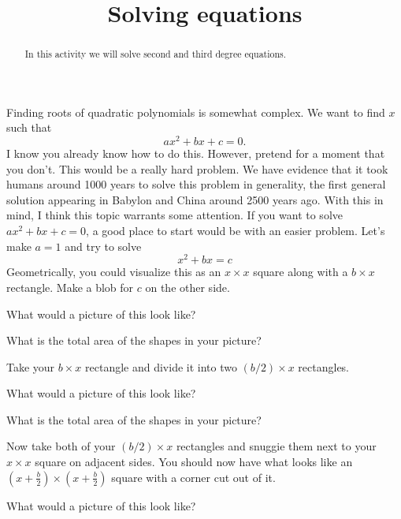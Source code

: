 \documentclass{ximera}
\title{Solving equations}
\begin{document}
\begin{abstract}
In this activity we will solve second and third degree equations.
\end{abstract}
\maketitle


Finding roots of quadratic polynomials is somewhat complex. We want to
find $x$ such that
\[
ax^2 + bx + c = 0.
\]
I know you already know how to do this. However, pretend for a moment
that you don't. This would be a really hard problem. We have evidence
that it took humans around 1000 years to solve this problem in
generality, the first general solution appearing in Babylon and China
around 2500 years ago. With this in mind, I think this topic warrants
some attention. If you want to solve $ax^2 + bx + c = 0$, a good place
to start would be with an easier problem. Let's make $a=1$ and try to
solve
\[
x^2 + b x = c
\]
Geometrically, you could visualize this as an $x \times x$ square
along with a $b\times x$ rectangle. Make a blob for $c$ on the other side. 

\begin{question} What would a picture of this look like?
\end{question}


\begin{question} What is the total area of the shapes in your picture?
\end{question}


Take your $b\times x$ rectangle and divide it into two
$(b/2)\times x$ rectangles.

\begin{question} What would a picture of this look like?
\end{question}


\begin{question} What is the total area of the shapes in your picture?
\end{question}


Now take both of your $(b/2)\times x$ rectangles and snuggie them
next to your $x\times x$ square on adjacent sides. You should now have
what looks like an $(x + \frac{b}{2}) \times (x +
\frac{b}{2})$ square with a corner cut out of it.


\begin{question} What would a picture of this look like?
\end{question}
\end{document}
